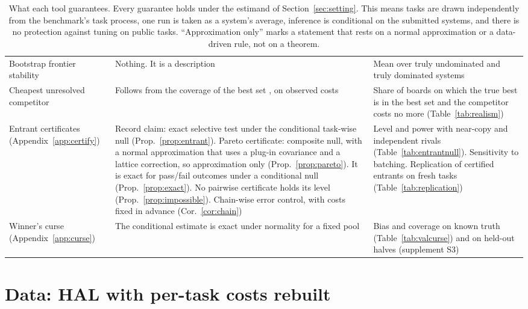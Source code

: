 \documentclass[11pt]{article}
\begin{document}
\begin{table}[!tbp]
\begin{tabular}{p{3.2cm}p{5.3cm}p{6.1cm}}
Bootstrap frontier stability & Nothing. It is a description & Mean over truly undominated and truly dominated systems \\
Cheapest unresolved competitor & Follows from the coverage of the best set \citep{hsu1981mcb}, on observed costs & Share of boards on which the true best is in the best set and the competitor costs no more (Table~\ref{tab:realism}) \\
Entrant certificates (Appendix~\ref{app:certify}) & Record claim: exact selective test under the conditional task-wise null (Prop.~\ref{prop:entrant}). Pareto certificate: composite null, with a normal approximation that uses a plug-in covariance and a lattice correction, so approximation only (Prop.~\ref{prop:pareto}). It is exact for pass/fail outcomes under a conditional null (Prop.~\ref{prop:exact}). No pairwise certificate holds its level (Prop.~\ref{prop:impossible}). Chain-wise error control, with costs fixed in advance (Cor.~\ref{cor:chain}) & Level and power with near-copy and independent rivals (Table~\ref{tab:entrantnull}). Sensitivity to batching. Replication of certified entrants on fresh tasks (Table~\ref{tab:replication}) \\
Winner's curse (Appendix~\ref{app:curse}) & The conditional estimate is exact under normality for a fixed pool \citep{lee2016exact} & Bias and coverage on known truth (Table~\ref{tab:valcurse}) and on held-out halves (supplement S3) \\
\bottomrule
\end{tabular}
\caption{What each tool guarantees. Every guarantee holds under the estimand of Section~\ref{sec:setting}. This means tasks are drawn independently from the benchmark's task process, one run is taken as a system's average, inference is conditional on the submitted systems, and there is no protection against tuning on public tasks. ``Approximation only'' marks a statement that rests on a normal approximation or a data-driven rule, not on a theorem.}
\label{tab:guarantees}
\end{table}


\section{Data: HAL with per-task costs rebuilt}
\label{sec:data}
\end{document}
